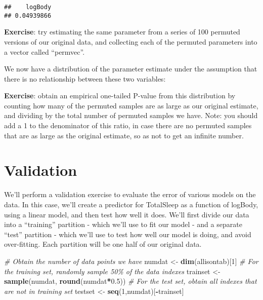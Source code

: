 \documentclass[
]{book}
\newenvironment{Shaded}{\begin{snugshade}}{\end{snugshade}}
\newcommand{\CommentTok}[1]{\textcolor[rgb]{0.56,0.35,0.01}{\textit{#1}}}
\newcommand{\DataTypeTok}[1]{\textcolor[rgb]{0.13,0.29,0.53}{#1}}
\newcommand{\DecValTok}[1]{\textcolor[rgb]{0.00,0.00,0.81}{#1}}
\newcommand{\FloatTok}[1]{\textcolor[rgb]{0.00,0.00,0.81}{#1}}
\newcommand{\KeywordTok}[1]{\textcolor[rgb]{0.13,0.29,0.53}{\textbf{#1}}}
\newcommand{\NormalTok}[1]{#1}
\newcommand{\OperatorTok}[1]{\textcolor[rgb]{0.81,0.36,0.00}{\textbf{#1}}}
\newcommand{\StringTok}[1]{\textcolor[rgb]{0.31,0.60,0.02}{#1}}
\begin{document}
\begin{Shaded}
\end{Shaded}

\begin{verbatim}
##    logBody 
## 0.04939866
\end{verbatim}

\textbf{Exercise}: try estimating the same parameter from a series of 100 permuted versions of our original data, and collecting each of the permuted parameters into a vector called ``permvec''.

We now have a distribution of the parameter estimate under the assumption that there is no relationship between these two variables:

\textbf{Exercise}: obtain an empirical one-tailed P-value from this distribution by counting how many of the permuted samples are as large as our original estimate, and dividing by the total number of permuted samples we have. Note: you should add a 1 to the denominator of this ratio, in case there are no permuted samples that are as large as the original estimate, so as not to get an infinite number.

\hypertarget{validation}{%
\section{Validation}\label{validation}}

We'll perform a validation exercise to evaluate the error of various models on the data. In this case, we'll create a predictor for TotalSleep as a function of logBody, using a linear model, and then test how well it does. We'll first divide our data into a ``training'' partition - which we'll use to fit our model - and a separate ``test'' partition - which we'll use to test how well our model is doing, and avoid over-fitting. Each partition will be one half of our original data.

\begin{Shaded}
\begin{Highlighting}[]
\CommentTok{\# Obtain the number of data points we have}
\NormalTok{numdat \textless{}{-}}\StringTok{ }\KeywordTok{dim}\NormalTok{(allisontab)[}\DecValTok{1}\NormalTok{]}
\CommentTok{\# For the training set, randomly sample 50\% of the data indexes}
\NormalTok{trainset \textless{}{-}}\StringTok{ }\KeywordTok{sample}\NormalTok{(numdat, }\KeywordTok{round}\NormalTok{(numdat}\OperatorTok{*}\FloatTok{0.5}\NormalTok{))}
\CommentTok{\# For the test set, obtain all indexes that are not in training set}
\NormalTok{testset \textless{}{-}}\StringTok{ }\KeywordTok{seq}\NormalTok{(}\DecValTok{1}\NormalTok{,numdat)[}\OperatorTok{{-}}\NormalTok{trainset]}
\end{Highlighting}
\end{Shaded}
\end{document}
